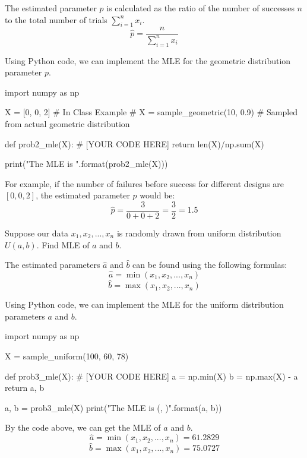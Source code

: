 \documentclass[a4paper, 10pt]{article}
\begin{document}
\begin{solution}
The estimated parameter \( p \) is calculated as the ratio of the number of successes \( n \) to the total number of trials \( \sum_{i=1}^{n} x_i \).
\[
    \hat{p} = \frac{n}{\sum_{i=1}^{n} x_i}
\] 

Using Python code, we can implement the MLE for the geometric distribution parameter \( p \).
\begin{codingbox}
import numpy as np

X = [0, 0, 2] # In Class Example
# X = sample_geometric(10, 0.9)   # Sampled from actual geometric distribution

def prob2_mle(X):
  # [YOUR CODE HERE]
  return len(X)/np.sum(X)

print("The MLE is {}".format(prob2_mle(X)))
\end{codingbox}

For example, if the number of failures before success for different designs are \( [0, 0, 2] \), the estimated parameter \( p \) would be:
\[
    \hat{p} = \frac{3}{0 + 0 + 2} = \frac{3}{2} = 1.5
\]
\end{solution}

\newpage

\begin{problem}
Suppose our data \( x_1, x_2, ..., x_n \) is randomly drawn from uniform distribution \( U(a,b) \). Find MLE of \( a \) and \( b \).
\end{problem}

\begin{solution}
The estimated parameters \( \hat{a} \) and \( \hat{b} \) can be found using the following formulas:
\[
    \hat{a} = \min(x_1, x_2, ..., x_n)
\]
\[
    \hat{b} = \max(x_1, x_2, ..., x_n)
\]

Using Python code, we can implement the MLE for the uniform distribution parameters \( a \) and \( b \).
\begin{codingbox}
import numpy as np

X = sample_uniform(100, 60, 78)

def prob3_mle(X):
  # [YOUR CODE HERE]
  a = np.min(X)
  b = np.max(X) - a
  return a, b

a, b = prob3_mle(X)
print("The MLE is ({}, {})".format(a, b))
\end{codingbox}

By the code above, we can get the MLE of \( a \) and \( b \).
\[
    \hat{a} = \min(x_1, x_2, ..., x_n) = 61.2829
\]
\[
    \hat{b} = \max(x_1, x_2, ..., x_n) = 75.0727
\]
\end{solution}
\end{document}
